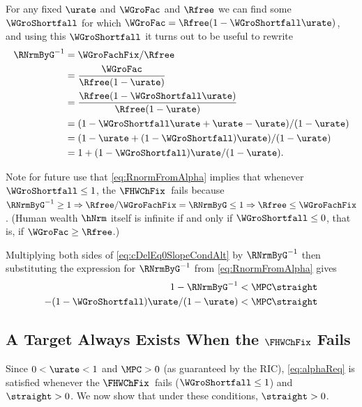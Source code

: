 \documentclass{econark}
\begin{document}
For any fixed $\urate$ and $\WGroFac$ and $\Rfree$ we can find some $\WGroShortfall$ for which $\WGroFac = \Rfree (1-\WGroShortfall \urate)$, and using this $\WGroShortfall$ it turns out to be useful to rewrite
\begin{equation}\begin{gathered}\begin{aligned}
  \RNrmByG^{-1} & =  \WGroFachFix/\Rfree
\\ & =  \frac{\WGroFac}{\Rfree(1-\urate)}
\\ & =  \frac{\Rfree(1-\WGroShortfall \urate)}{\Rfree(1-\urate)}
\\ & =  (1-\WGroShortfall \urate + \urate - \urate)/(1-\urate)
\\ & =  (1-\urate+(1-\WGroShortfall) \urate)/(1-\urate)
\\ & =  1+(1-\WGroShortfall)\urate/(1-\urate) \label{eq:RnormFromAlpha}
.
\end{aligned}\end{gathered}\end{equation}

Note for future use that \eqref{eq:RnormFromAlpha} implies that whenever $\WGroShortfall \leq 1$, the $\FHWChFix$~fails because $\RNrmByG^{-1} \geq 1 \Rightarrow \Rfree/\WGroFachFix = \RNrmByG \leq 1 \Rightarrow \Rfree \leq \WGroFachFix$.  (Human wealth $\hNrm$ itself is infinite if and only if $\WGroShortfall \leq 0$, that is, if $\WGroFac \geq \Rfree$.)  

Multiplying both sides of \eqref{eq:cDelEq0SlopeCondAlt} by $\RNrmByG^{-1}$ then substituting the expression for $\RNrmByG^{-1}$ from \eqref{eq:RnormFromAlpha} gives
\begin{equation}\begin{gathered}\begin{aligned}
  1- \RNrmByG^{-1} & <  \MPC \straight
\\ - (1-\WGroShortfall)\urate/(1-\urate) & <  \MPC \straight \label{eq:alphaReq}
\end{aligned}\end{gathered}\end{equation}

\subsection{A Target Always Exists When the $\FHWChFix$ Fails}\label{sec:TractableBufferStock-TargetWhenFHWChFixFails}

Since $0 < \urate < 1$ and $\MPC>0$ (as guaranteed by the RIC), \eqref{eq:alphaReq} is satisfied whenever the $\FHWChFix$~fails ($\WGroShortfall \leq 1$) and $\straight > 0$.
We now show that under these conditions, $\straight>0$.
\end{document}
